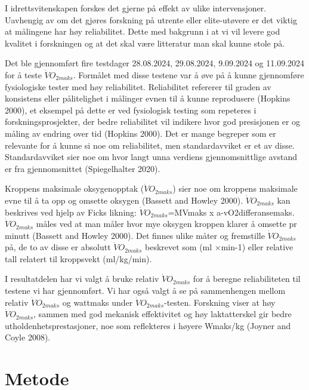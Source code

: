 \documentclass[
  letterpaper,
  DIV=11,
  numbers=noendperiod]{scrreprt}
\begin{document}
I idrettsvitenskapen forskes det gjerne på effekt av ulike
intervensjoner. Uavhengig av om det gjøres forskning på utrente eller
elite-utøvere er det viktig at målingene har høy reliabilitet. Dette med
bakgrunn i at vi vil levere god kvalitet i forskningen og at det skal
være litteratur man skal kunne stole på.

Det ble gjennomført fire testdager 28.08.2024, 29.08.2024, 9.09.2024 og
11.09.2024 for å teste \(\dot{V}O_{2maks}\). Formålet med disse testene
var å øve på å kunne gjennomføre fysiologiske tester med høy
reliabilitet. Reliabilitet refererer til graden av konsistens eller
pålitelighet i målinger evnen til å kunne reprodusere (Hopkins 2000), et
eksempel på dette er ved fysiologisk testing som repeteres i
forskningsprosjekter, der bedre reliabilitet vil indikere hvor god
presisjonen er og måling av endring over tid (Hopkins 2000). Det er
mange begreper som er relevante for å kunne si noe om reliabilitet, men
standardavviket er et av disse. Standardavviket sier noe om hvor langt
unna verdiens gjennomsnittlige avstand er fra gjennomsnittet
(Spiegelhalter 2020).

Kroppens maksimale oksygenopptak (\(\dot{V}O_{2maks}\)) sier noe om
kroppens maksimale evne til å ta opp og omsette oksygen (Bassett and
Howley 2000). \(\dot{V}O_{2maks}\) kan beskrives ved hjelp av Ficks
likning: \(\dot{V}O_{2maks}\)=MVmaks x a-vO2differansemaks.
\(\dot{V}O_{2maks}\) måles ved at man måler hvor mye oksygen kroppen
klarer å omsette pr minutt (Bassett and Howley 2000). Det finnes ulike
måter og fremstille \(\dot{V}O_{2maks}\) på, de to av disse er absolutt
\(\dot{V}O_{2maks}\) beskrevet som (ml ×min-1) eller relative tall
relatert til kroppsvekt (ml/kg/min).

I resultatdelen har vi valgt å bruke relativ \(\dot{V}O_{2maks}\) for å
beregne reliabiliteten til testene vi har gjennomført. Vi har også valgt
å se på sammenhengen mellom relativ \(\dot{V}O_{2maks}\) og wattmaks
under \(\dot{V}O_{2maks}\)-testen. Forskning viser at høy
\(\dot{V}O_{2maks}\), sammen med god mekanisk effektivitet og høy
laktatterskel gir bedre utholdenhetsprestasjoner, noe som reflekteres i
høyere Wmaks/kg (Joyner and Coyle 2008).

\section{Metode}\label{metode}
\end{document}
